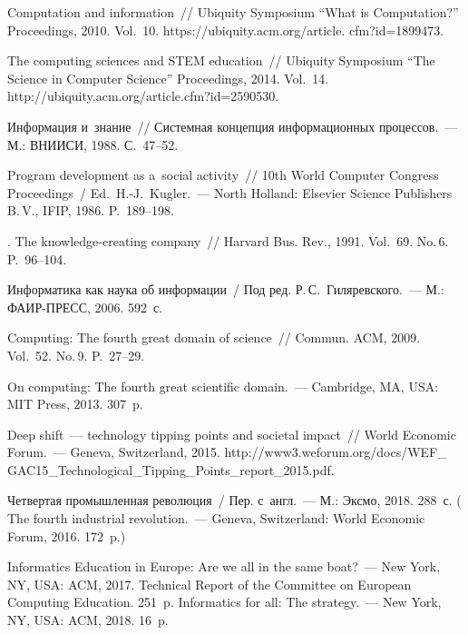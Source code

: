 \begin{multicols}{2}
{{\begin{thebibliography}{99}
 Computation and information~// Ubiquity Symposium ``What is Computation?'' 
Proceedings, 2010. Vol.~10. {\sf https://ubiquity.acm.org/article. cfm?id=1899473}.

 The computing sciences and STEM education~// Ubiquity Symposium ``The 
Science in Computer Science'' Proceedings, 2014. Vol.~14. {\sf 
http://\linebreak ubiquity.acm.org/article.cfm?id=2590530}.

 Информация и~знание~// Сис\-тем\-ная концепция информационных 
процессов.~--- М.: ВНИИСИ, 1988. С.~47--52.

 Program development as a~social activity~// 10th 
World Computer Congress Proceedings~/ Ed.~\mbox{H.-J.}~Kugler.~--- North Holland: Elsevier Science 
Publishers B.\,V., IFIP, 1986. P.~189--198.

. The knowledge-creating company~// Harvard Bus. Rev., 1991. Vol.~69. No.\,6. 
P.~96--104.

Информатика как наука об информации~/ Под ред. Р.\,С.~Гиляревского.~---  
М.: ФАИР-ПРЕСС, 2006. 592~с.

 Computing: The fourth great domain of science~// 
Commun. ACM, 2009. Vol.~52. No.\,9. P.~27--29.

 On computing: The fourth great scientific domain.~--- Cambridge, MA, 
USA: MIT Press, 2013. 307~p.


Deep shift~--- technology tipping points and societal impact~//
World Economic Forum.~--- Geneva, Switzerland, %
2015. {\sf 
http://www3.weforum.org/docs/WEF\_ GAC15\_Technological\_Tipping\_Points\_report\_2015.pdf}.

 Четвертая промышленная революция~/ Пер. с~англ.~--- М.: Эксмо, 2018. 288~с. 
( The fourth industrial revolution.~--- Geneva, Switzerland: World Economic 
Forum, 2016. 172~p.)

Informatics Education in Europe: Are we all in the same boat?~--- New York, NY, USA: ACM, 2017. 
 Technical Report of the Committee 
on European Computing Education. 251~p.
 Informatics for all: The 
strategy.~--- New York, NY, USA: ACM, 2018. 16~p.


\end{thebibliography}}}
\end{multicols}
